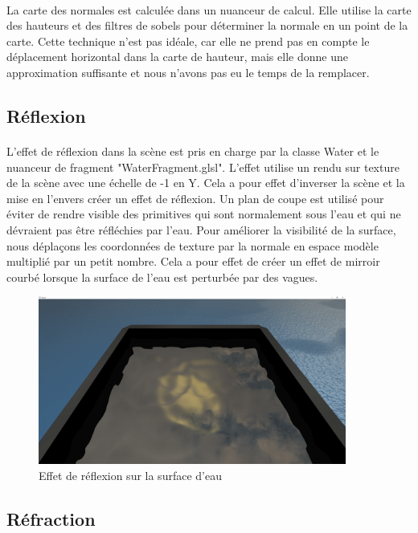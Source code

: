 \documentclass[a4paper, 12pt]{article} %
\begin{document}
	\paragraph{}
	La carte des normales est calculée dans un nuanceur de calcul. Elle utilise la carte des hauteurs et des filtres de sobels pour déterminer la normale en
	un point de la carte. Cette technique n'est pas idéale, car elle ne prend pas en compte le déplacement horizontal dans la carte de hauteur, mais elle donne
	une approximation suffisante et nous n'avons pas eu le temps de la remplacer. 
\subsection{Réflexion}
	\paragraph{}
	L'effet de réflexion dans la scène est pris en charge par la classe Water et le nuanceur de fragment "WaterFragment.glsl". L'effet utilise un rendu sur 
	texture de la scène avec une échelle de -1 en Y. Cela a pour effet d'inverser la scène et la mise en l'envers créer un effet de réflexion. Un plan de 
	coupe est utilisé pour éviter de rendre visible des primitives qui sont normalement sous l'eau et qui ne dévraient pas être réfléchies par l'eau. Pour améliorer
	la visibilité de la surface, nous déplaçons les coordonnées de texture par la normale en espace modèle multiplié par un petit nombre. Cela a pour effet de 
	créer un effet de mirroir courbé lorsque la surface de l'eau est perturbée par des vagues.
\begin{figure}
	\centering
	\includegraphics[width=0.9\textwidth]{./PhotoRapport/Reflection.png}
	\caption{Effet de réflexion sur la surface d'eau}
	\label{Reflexion}
\end{figure}
\subsection{Réfraction}
\end{document}

